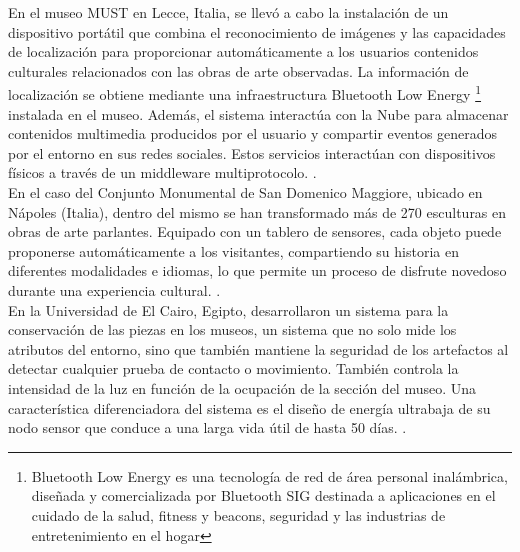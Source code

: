         En el museo MUST en Lecce, Italia, se llevó a cabo la instalación de un dispositivo portátil que combina el reconocimiento de imágenes y las capacidades de localización para proporcionar automáticamente a los usuarios contenidos culturales relacionados con las obras de arte observadas. La información de localización se obtiene mediante una infraestructura Bluetooth Low Energy \footnote{Bluetooth Low Energy es una tecnología de red de área personal inalámbrica, diseñada y comercializada por Bluetooth SIG destinada a aplicaciones en el cuidado de la salud, fitness y beacons, seguridad y las industrias de entretenimiento en el hogar} instalada en el museo. Además, el sistema interactúa con la Nube para almacenar contenidos multimedia producidos por el usuario y compartir eventos generados por el entorno en sus redes sociales. Estos servicios interactúan con dispositivos físicos a través de un middleware multiprotocolo. \cite{museoItalia}.\\

        En el caso del Conjunto Monumental de San Domenico Maggiore, ubicado en Nápoles (Italia), dentro del mismo se han transformado más de 270 esculturas en obras de arte parlantes. Equipado con un tablero de sensores, cada objeto puede proponerse automáticamente a los visitantes, compartiendo su historia en diferentes modalidades e idiomas, lo que permite un proceso de disfrute novedoso durante una experiencia cultural. \cite{monumentoSanDomenico}.\\

        En la Universidad de El Cairo, Egipto, desarrollaron un sistema para la conservación de las piezas en los museos, un sistema que no solo mide los atributos del entorno, sino que también mantiene la seguridad de los artefactos al detectar cualquier prueba de contacto o movimiento. También controla la intensidad de la luz en función de la ocupación de la sección del museo. Una característica diferenciadora del sistema es el diseño de energía ultrabaja de su nodo sensor que conduce a una larga vida útil de hasta 50 días. \cite{ultraLowPowerConservacion}.\\
        
